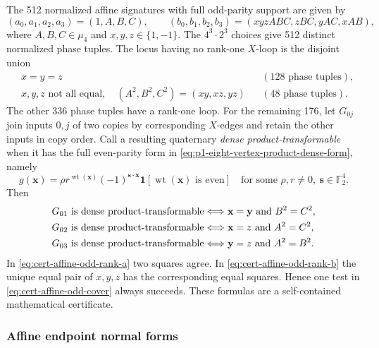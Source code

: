 \documentclass[11pt,letterpaper,onecolumn]{article}
\theoremstyle{plain}
\theoremstyle{definition}
\theoremstyle{remark}
\newcommand{\Ftwo}{\mathbb F_2}
\newcommand{\wt}{\operatorname{wt}}
\newcommand{\one}{\mathbf 1}
\begin{document}
The 512 normalized affine signatures with full odd-parity support are given by
\begin{equation}
 (a_0,a_1,a_2,a_3)=(1,A,B,C),\qquad
 (b_0,b_1,b_2,b_3)=(xyzABC,zBC,yAC,xAB),
 \label{eq:cert-affine-odd-param}
\end{equation}
where \(A,B,C\in\mu_4\) and \(x,y,z\in\{1,-1\}\). The \(4^3\cdot2^3\)
choices give 512 distinct normalized phase tuples.  The locus having no rank-one
\(X\)-loop is the disjoint union
\begin{align}
 &x=y=z &&(128\text{ phase tuples}),\label{eq:cert-affine-odd-rank-a}\\
 &x,y,z\text{ not all equal},\quad
   (A^2,B^2,C^2)=(xy,xz,yz)
 &&(48\text{ phase tuples}).\label{eq:cert-affine-odd-rank-b}
\end{align}
The other 336 phase tuples have a rank-one loop.  For the remaining 176, let
\(G_{0j}\) join inputs \(0,j\) of two copies by corresponding \(X\)-edges and retain the other inputs in copy order.  Call a resulting
quaternary \emph{dense product-transformable} when it has the full even-parity form
in \cref{eq:p1-eight-vertex-product-dense-form}, namely
\[
 g({\mathbf{x}})=\rho r^{\wt({\mathbf{x}})}(-1)^{{\mathbf{s}}\cdot {\mathbf{x}}}
       \one[\wt({\mathbf{x}})\text{ is even}]
 \quad\text{for some }\rho,r\ne0,\ {\mathbf{s}}\in\Ftwo^4.
\]
Then
\begin{align}
G_{01}\text{ is dense product-transformable}
  &\Longleftrightarrow {\mathbf{x}}={\mathbf{y}}\text{ and }B^2=C^2,\notag\\
G_{02}\text{ is dense product-transformable}
  &\Longleftrightarrow {\mathbf{x}}=z\text{ and }A^2=C^2,\notag\\
G_{03}\text{ is dense product-transformable}
  &\Longleftrightarrow {\mathbf{y}}=z\text{ and }A^2=B^2.
\label{eq:cert-affine-odd-cover}
\end{align}
In \cref{eq:cert-affine-odd-rank-a} two squares agree. In
\cref{eq:cert-affine-odd-rank-b} the unique equal pair of \(x,y,z\) has
the corresponding equal squares.  Hence one test in
\cref{eq:cert-affine-odd-cover} always succeeds.  These formulas are a
self-contained mathematical certificate.

\subsubsection{Affine endpoint normal forms}
\label{proofsubsec:cert-affine-q4-endpoint}
\end{document}
